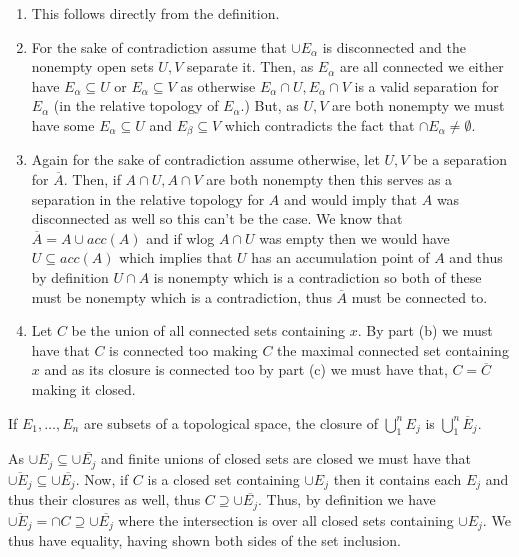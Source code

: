 \documentclass[12pt,a4paper]{article}
\begin{document}
\begin{solution}
\begin{enumerate}[label=\alph*.]
\item This follows directly from the definition. 
\item For the sake of contradiction assume that $\cup E_\alpha$ is disconnected and the nonempty open sets $U,V$ separate it. 
    Then, as $E_\alpha$ are all connected we either have $E_\alpha\subseteq U$ or $E_\alpha\subseteq V$ as otherwise $E_\alpha\cap U,E_\alpha\cap V$ is a valid separation for $E_\alpha$ (in the relative topology of $E_\alpha$.) 
    But, as $U,V$ are both nonempty we must have some $E_\alpha\subseteq U$ and $E_\beta\subseteq V$ which contradicts the fact that $\cap E_\alpha\neq\emptyset.$
\item Again for the sake of contradiction assume otherwise, let $U,V$ be a separation for $\overline{A}$. 
    Then, if $A\cap U,A\cap V$ are both nonempty then this serves as a separation in the relative topology for $A$ and would imply that $A$ was disconnected as well so this can't be the case. 
    We know that $\overline{A}=A\cup acc(A)$ and if wlog $A\cap U$ was empty then we would have $U\subseteq acc(A)$ which implies that $U$ has an accumulation point of $A$ and thus by definition $U\cap A$ is nonempty which is a contradiction so both of these must be nonempty which is a contradiction, thus $\overline{A}$ must be connected to. 
\item Let $C$ be the union of all connected sets containing $x.$ 
    By part (b) we must have that $C$ is connected too making $C$ the maximal connected set containing $x$ and as its closure is connected too by part (c) we must have that, $C=\overline{C}$ making it closed. 
\end{enumerate}
\end{solution}
\begin{problem}\label{prob:4-11}
If $E_1, \dots, E_n$ are subsets of a topological space, the closure of $\bigcup_{1}^n E_j$ is $\bigcup_{1}^n \overline{E}_j$.
\end{problem}
\begin{solution}
    As $\cup E_j\subseteq\cup \overline{E_j}$ and finite unions of closed sets are closed we must have that $\overline{\cup E_j}\subseteq\cup\overline{E_j}$. 
    Now, if $C$ is a closed set containing $\cup E_j$ then it contains each $E_j$ and thus their closures as well, thus $C\supseteq\cup\overline{E_j}$. 
    Thus, by definition we have $\overline{\cup E_j}=\cap C\supseteq\cup\overline{E_j}$ where the intersection is over all closed sets containing $\cup E_j.$ 
    We thus have equality, having shown both sides of the set inclusion. 
\end{solution}
\end{document}
